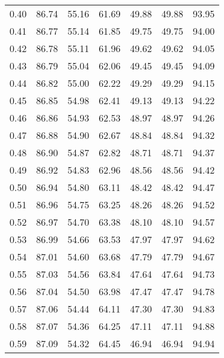 \begin{tabular}{|c|c|c|c|c|c|c|}
      0.40 &     86.74 &     55.16 &      61.69 &   49.88 &      49.88 &         93.95 \\
      0.41 &     86.77 &     55.14 &      61.85 &   49.75 &      49.75 &         94.00 \\
      0.42 &     86.78 &     55.11 &      61.96 &   49.62 &      49.62 &         94.05 \\
      0.43 &     86.79 &     55.04 &      62.06 &   49.45 &      49.45 &         94.09 \\
      0.44 &     86.82 &     55.00 &      62.22 &   49.29 &      49.29 &         94.15 \\
      0.45 &     86.85 &     54.98 &      62.41 &   49.13 &      49.13 &         94.22 \\
      0.46 &     86.86 &     54.93 &      62.53 &   48.97 &      48.97 &         94.26 \\
      0.47 &     86.88 &     54.90 &      62.67 &   48.84 &      48.84 &         94.32 \\
      0.48 &     86.90 &     54.87 &      62.82 &   48.71 &      48.71 &         94.37 \\
      0.49 &     86.92 &     54.83 &      62.96 &   48.56 &      48.56 &         94.42 \\
      0.50 &     86.94 &     54.80 &      63.11 &   48.42 &      48.42 &         94.47 \\
      0.51 &     86.96 &     54.75 &      63.25 &   48.26 &      48.26 &         94.52 \\
      0.52 &     86.97 &     54.70 &      63.38 &   48.10 &      48.10 &         94.57 \\
      0.53 &     86.99 &     54.66 &      63.53 &   47.97 &      47.97 &         94.62 \\
      0.54 &     87.01 &     54.60 &      63.68 &   47.79 &      47.79 &         94.67 \\
      0.55 &     87.03 &     54.56 &      63.84 &   47.64 &      47.64 &         94.73 \\
      0.56 &     87.04 &     54.50 &      63.98 &   47.47 &      47.47 &         94.78 \\
      0.57 &     87.06 &     54.44 &      64.11 &   47.30 &      47.30 &         94.83 \\
      0.58 &     87.07 &     54.36 &      64.25 &   47.11 &      47.11 &         94.88 \\
      0.59 &     87.09 &     54.32 &      64.45 &   46.94 &      46.94 &         94.94 \\

\end{tabular}
